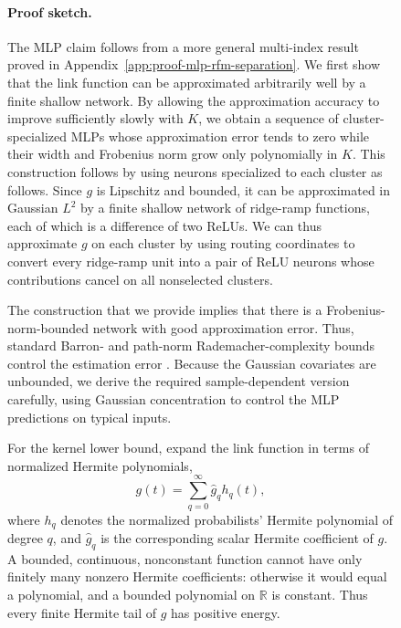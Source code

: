 \documentclass{article}
\begin{document}
\begin{figure}
\paragraph{Proof sketch.}
The MLP claim follows from a more general multi-index result proved in
Appendix~\ref{app:proof-mlp-rfm-separation}. We first show that the link function can be approximated arbitrarily well
by a finite shallow network. By allowing the approximation accuracy to
improve sufficiently slowly with $K$, we obtain a sequence of
cluster-specialized MLPs whose approximation error tends to zero while
their width and Frobenius norm grow only polynomially in $K$. This construction follows by using neurons specialized to each cluster as follows. Since
$g$ is Lipschitz and bounded, it can be approximated in Gaussian $L^2$ by a
finite shallow network of ridge-ramp functions, each of which is a
difference of two ReLUs. We can thus approximate $g$ on each cluster by using routing
coordinates to convert every ridge-ramp unit into a pair of ReLU neurons whose
contributions cancel on all nonselected clusters.

The construction that we provide implies that there is a Frobenius-norm-bounded network with good approximation error. Thus, standard Barron- and path-norm Rademacher-complexity bounds control the
estimation error
\citep{e2022barron,bach2017breaking,golowich2018size}.
Because the Gaussian covariates are unbounded, we derive the required
sample-dependent version carefully, using Gaussian concentration to control
the MLP predictions on typical inputs.

For the kernel lower bound, expand the link function in terms of normalized Hermite
polynomials,
\[
    g(t)=\sum_{q=0}^\infty\widehat g_qh_q(t),
\]
where $h_q$ denotes the normalized probabilists' Hermite polynomial of degree
$q$, and $\widehat g_q$ is the corresponding scalar Hermite coefficient of $g$.
A bounded, continuous, nonconstant function cannot have only finitely many
nonzero Hermite coefficients: otherwise it would equal a polynomial, and a
bounded polynomial on $\mathbb R$ is constant. Thus every finite Hermite tail
of $g$ has positive energy.



\end{figure}
\end{document}

